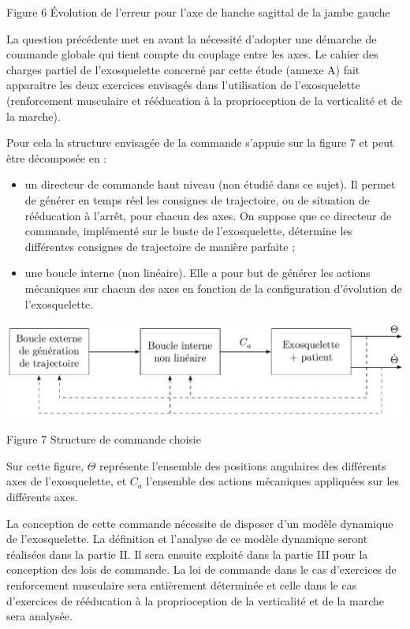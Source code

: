 \documentclass[10pt]{article}
\begin{document}
Figure 6 Évolution de l'erreur pour l'axe de hanche sagittal de la jambe gauche

La question précédente met en avant la nécessité d'adopter une démarche de commande globale qui tient compte du couplage entre les axes. Le cahier des charges partiel de l'exosquelette concerné par cette étude (annexe A) fait apparaitre les deux exercices envisagés dans l'utilisation de l'exosquelette (renforcement musculaire et rééducation à la proprioception de la verticalité et de la marche).

Pour cela la structure envisagée de la commande s'appuie sur la figure 7 et peut être décomposée en :

\begin{itemize}
  \item un directeur de commande haut niveau (non étudié dans ce sujet). Il permet de générer en temps réel les consignes de trajectoire, ou de situation de rééducation à l'arrêt, pour chacun des axes. On suppose que ce directeur de commande, implémenté sur le buste de l'exosquelette, détermine les différentes consignes de trajectoire de manière parfaite ;

  \item une boucle interne (non linéaire). Elle a pour but de générer les actions mécaniques sur chacun des axes en fonction de la configuration d'évolution de l'exosquelette.

\end{itemize}

\begin{center}
\includegraphics[max width=\textwidth]{2023_05_12_54c6a64d2ffce28d5c72g-04(1)}
\end{center}

Figure 7 Structure de commande choisie

Sur cette figure, $\Theta$ représente l'ensemble des positions angulaires des différents axes de l'exosquelette, et $C_{a}$ l'ensemble des actions mécaniques appliquées sur les différents axes.

La conception de cette commande nécessite de disposer d'un modèle dynamique de l'exosquelette. La définition et l'analyse de ce modèle dynamique seront réalisées dans la partie II. Il sera ensuite exploité dans la partie III pour la conception des lois de commande. La loi de commande dans le cas d'exercices de renforcement musculaire sera entièrement déterminée et celle dans le cas d'exercices de rééducation à la proprioception de la verticalité et de la marche sera analysée.
\end{document}

